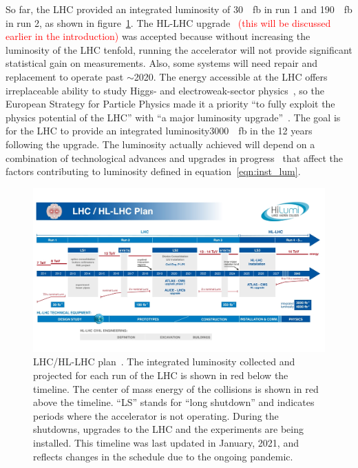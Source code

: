 So far, the LHC provided an integrated luminosity of \SI{30}{\per\femto\barn} in run 1 and \SI{190}{\per\femto\barn} in run 2, as shown in figure~\ref{fig:hl-lhc}. The HL-LHC upgrade~\cite{hl_lhc_tdr} \textcolor{red}{(this will be discussed earlier in the introduction)} was accepted because without increasing the luminosity of the LHC tenfold, running the accelerator will not provide significant statistical gain on measurements. Also, some systems will need repair and replacement to operate past $\sim$2020. The energy accessible at the LHC offers irreplaceable ability to study Higgs- and electroweak-sector physics~\cite{dainese_physics_2018}, so the European Strategy for Particle Physics made it a priority ``to fully exploit the physics potential of the LHC'' with ``a major luminosity upgrade''~\cite{european_strategy_for_particle_physics}. The goal is for the LHC to provide an integrated luminosity\SI{3000}{\per\femto\barn} in the 12 years following the upgrade. The luminosity actually achieved will depend on a combination of technological advances and upgrades in progress~\cite{hl_lhc_tdr} that affect the factors contributing to luminosity defined in equation~\ref{eqn:inst_lum}.


\begin{figure}
    \centering
    \includegraphics[width = \textwidth]{figures/HL-LHC-updated-January-2021_small.jpg}
    \caption{LHC/HL-LHC plan~\cite{hl-lhc_plan_picture_website}. The integrated luminosity collected and projected for each run of the LHC is shown in red below the timeline. The center of mass energy of the collisions is shown in red above the timeline. ``LS'' stands for ``long shutdown'' and indicates periods where the accelerator is not operating. During the shutdowns, upgrades to the LHC and the experiments are being installed. This timeline was last updated in January, 2021, and reflects changes in the schedule due to the ongoing pandemic. }
    \label{fig:hl-lhc}
\end{figure}

